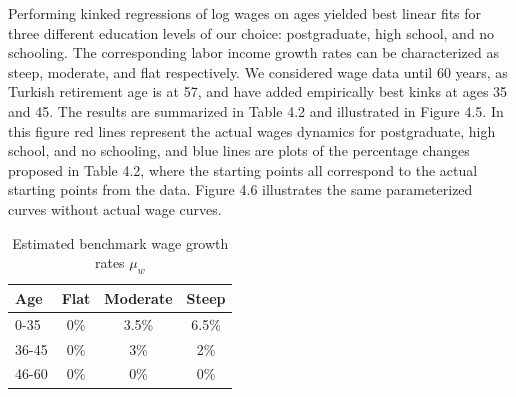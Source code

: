Performing kinked regressions of log wages on ages yielded best linear fits for three different education levels of our choice: postgraduate, high school, and no schooling. The corresponding labor income growth rates can be characterized as steep, moderate, and flat respectively. We considered wage data until 60 years, as Turkish retirement age is at 57, and have added empirically best kinks at ages 35 and 45. The results are summarized in Table 4.2 and illustrated in Figure 4.5. In this figure red lines represent the actual wages dynamics for postgraduate, high school, and no schooling, and blue lines are plots of the percentage changes proposed in Table 4.2, where the starting points all correspond to the actual starting points from the data. Figure 4.6 illustrates the same parameterized curves without actual wage curves. 

\begin{table}
	\centering
	\begin{tabular}[c]{l|ccc}
		Age&Flat&Moderate&Steep\\
		\hline
		0-35&0\%&3.5\%&6.5\%\\
		36-45&0\%&3\%&2\%\\
		46-60&0\%&0\%&0\%\\
	\end{tabular}
	\caption{Estimated benchmark wage growth rates $\mu_w$}
\end{table}


